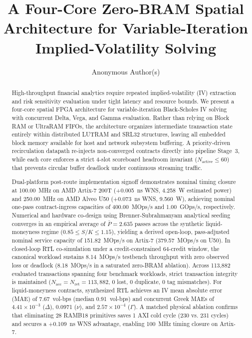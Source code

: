 \documentclass[sigconf,anonymous,review]{acmart}
\begin{document}
\title{A Four-Core Zero-BRAM Spatial Architecture for Variable-Iteration Implied-Volatility Solving}

\author{Anonymous Author(s)}

\begin{abstract}
High-throughput financial analytics require repeated implied-volatility (IV) extraction and risk sensitivity evaluation under tight latency and resource bounds. We present a four-core spatial FPGA architecture for variable-iteration Black-Scholes IV solving with concurrent Delta, Vega, and Gamma evaluation. Rather than relying on Block RAM or UltraRAM FIFOs, the architecture organizes intermediate transaction state entirely within distributed LUTRAM and SRL32 structures, leaving all embedded block memory available for host and network subsystem buffering. A priority-driven recirculation datapath re-injects non-converged contracts directly into pipeline Stage~3, while each core enforces a strict 4-slot scoreboard headroom invariant ($N_{\text{active}} \le 60$) that prevents circular buffer deadlock under continuous streaming traffic. 

Dual-platform post-route implementation signoff demonstrates nominal timing closure at 100.00~MHz on AMD Artix-7 200T (+0.005~ns WNS, 4.258~W estimated power) and 250.00~MHz on AMD Alveo U50 (+0.073~ns WNS, 9.560~W), achieving nominal one-pass contract-ingress capacities of 400.00~MOps/s and 1.00~GOps/s, respectively. Numerical and hardware co-design using Brenner-Subrahmanyam analytical seeding converges in an empirical average of $\bar{P} = 2.635$ passes across the synthetic liquid-moneyness regime ($0.85 \le S/K \le 1.15$), yielding a derived open-loop, pass-adjusted nominal service capacity of 151.82~MOps/s on Artix-7 (379.57~MOps/s on U50). In closed-loop RTL co-simulation under a credit-constrained 64-credit window, the canonical workload sustains 8.14~MOps/s testbench throughput with zero observed loss or deadlock (8.18~MOps/s in a saturated zero-BRAM ablation). Across 113,882 evaluated transactions spanning four benchmark workloads, strict transaction integrity is maintained ($N_{\text{acc}} = N_{\text{ret}} = 113{,}882$, 0 lost, 0 duplicate, 0 tag mismatches). For liquid-moneyness contracts, synthesized RTL achieves an IV mean absolute error (MAE) of 7.67~vol-bps (median 0.91~vol-bps) and concurrent Greek MAEs of $4.41\times 10^{-3}$ ($\Delta$), 0.0971 ($\nu$), and $2.57\times 10^{-4}$ ($\Gamma$). A matched physical ablation confirms that eliminating 28 RAMB18 primitives saves 1 AXI cold cycle (230 vs. 231 cycles) and secures a +0.109~ns WNS advantage, enabling 100~MHz timing closure on Artix-7.
\end{abstract}
\end{document}
